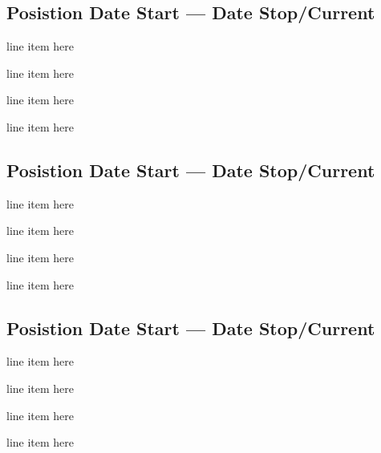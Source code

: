 \documentclass[letter,10pt]{article}
\begin{document}
\subsection{{Posistion \hfill Date Start --- Date Stop/Current}}
\begin{zitemize}
\item line item here
\item line item here
\item line item here
\item line item here
\end{zitemize}

\subsection{{Posistion \hfill Date Start --- Date Stop/Current}}
\begin{zitemize}
\item line item here
\item line item here
\item line item here
\item line item here
\end{zitemize}

\subsection{{Posistion \hfill Date Start --- Date Stop/Current}}
\begin{zitemize}
\item line item here
\item line item here
\item line item here
\item line item here
\end{zitemize}
\end{document}
